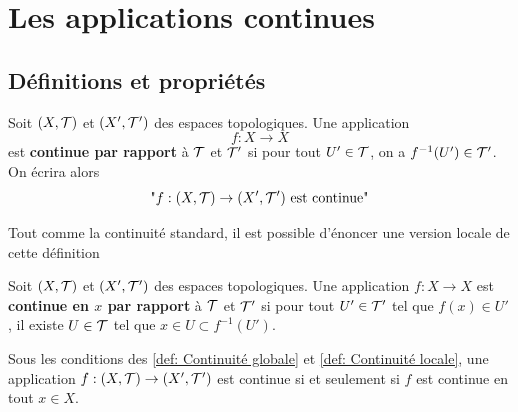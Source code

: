\section{Les applications continues}

\subsection{Définitions et propriétés}

\begin{definition} \label{def: Continuité globale}
	Soit $(X, \mathcal T)$ et $(X', \mathcal T')$ des espaces topologiques. Une application
	\[
	f : X \to X
	\]
	est \textbf{continue par rapport} à $\mathcal T$ et $\mathcal T'$ si pour tout $U' \in \mathcal T$, on a $f^{-1}(U') \in \mathcal T'$. On écrira alors
	\[
	\text{"$f :(X, \mathcal T) \to (X', \mathcal T')$ est continue"}
	\]
\end{definition}
Tout comme la continuité standard, il est possible d'énoncer une version locale de cette définition

\begin{definition} \label{def: Continuité locale}
	Soit $(X, \mathcal T)$ et $(X', \mathcal T')$ des espaces topologiques. Une application $f : X \to X$ est \textbf{continue en $x$ par rapport} à $\mathcal T$ et $\mathcal T'$ si pour tout $U	' \in \mathcal T'$ tel que $f(x) \in U'$, il existe $U \in \mathcal T$ tel que $x \in U \subset f^{-1}(U')$.
\end{definition}

\begin{lemme}
	Sous les conditions des \autoref{def: Continuité globale} et \autoref{def: Continuité locale}, une application $f : (X, \mathcal T) \to (X', \mathcal T')$ est continue si et seulement si $f$ est continue en tout $x \in X$.
\end{lemme}


